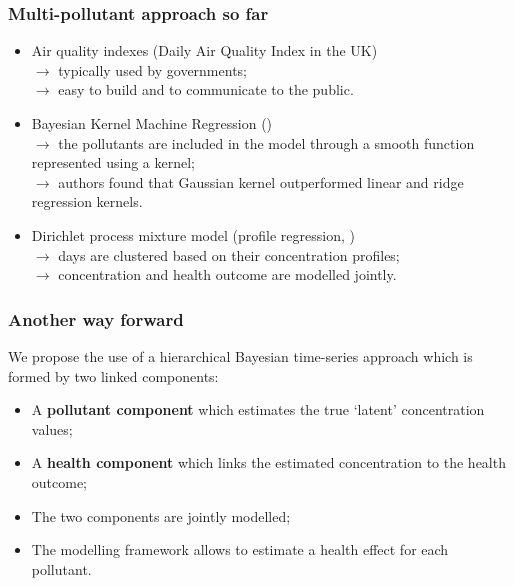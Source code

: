 \documentclass[slidestop,compress,serif,10pt]{beamer}
\begin{document}
\begin{frame}
\frametitle{Multi-pollutant approach so far}
\begin{itemize}
\vfill\item Air quality indexes (Daily Air Quality Index in the UK)\\
$\rightarrow$ typically used by governments;\\
$\rightarrow$ easy to build and to communicate to the public.
\vfill\item Bayesian Kernel Machine Regression (\citealt{Bobb:2015})\\
$\rightarrow$ the pollutants are included in the model through a smooth function represented using a kernel;\\
$\rightarrow$ authors found that Gaussian kernel outperformed linear and ridge regression kernels.
\vfill\item Dirichlet process mixture model (profile regression, \citealt{PIRANI201556})\\
$\rightarrow$ days are clustered based on their concentration profiles;\\
$\rightarrow$ concentration and health outcome are modelled jointly.
\end{itemize}
\end{frame}
\begin{frame}
\frametitle{Another way forward}
We propose the use of a hierarchical Bayesian time-series approach which is formed by two linked components:
\begin{itemize}
\vfill\item A \textbf{pollutant component} which estimates the true `latent' concentration values;
\vfill\item A \textbf{health component} which links the estimated concentration to the health outcome;\\
\vfill\item The two components are \alert{jointly modelled};\\
\vfill\item The modelling framework allows to estimate a health effect for each pollutant.
\end{itemize}
\end{frame}
\end{document}
